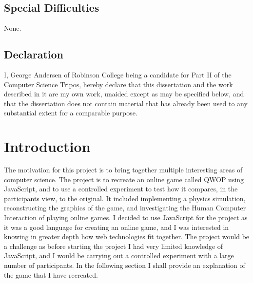\documentclass[12pt,a4paper,twoside,openright]{report}
\begin{document}

\section*{Special Difficulties}

None.


\section*{Declaration}
I, George Andersen of Robinson College being a candidate for Part II of the Computer Science Tripos, hereby declare that this dissertation and the work described in it are my own work, unaided except as may be specified below, and that the dissertation does not contain material that has already been used to any substantial extent for a comparable purpose.

\bigskip
{}
\medskip
{}

\tableofcontents

\listoffigures





\chapter{Introduction}

The motivation for this project is to bring together multiple interesting areas of computer science. The project is to recreate an online game called QWOP using JavaScript, and to use a controlled experiment to test how it compares, in the participants view, to the original.
It included implementing a physics simulation, reconstructing the graphics of the game, and investigating the Human Computer Interaction of playing online games.
I decided to use JavaScript for the project as it was a good language for creating an online game, and I was interested in knowing in greater depth how web technologies fit together.
The project would be a challenge as before starting the project I had very limited knowledge of JavaScript, and I would be carrying out a controlled experiment with a large number of participants.
In the following section I shall provide an explanation of the game that I have recreated.
\end{document}
